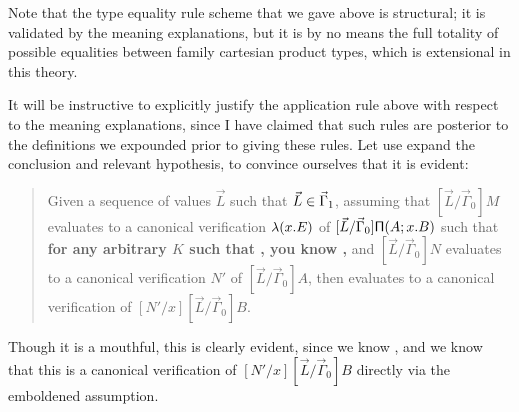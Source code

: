 \documentclass[main.tex]{subfiles}
\begin{document}
Note that the type equality rule scheme that we gave above is structural; it is
validated by the meaning explanations, but it is by no means the full totality
of possible equalities between family cartesian product types, which is
extensional in this theory.

It will be instructive to explicitly justify the application rule above with
respect to the meaning explanations, since I have claimed that such rules are
posterior to the definitions we expounded prior to giving these rules. Let use
expand the conclusion and relevant hypothesis, to convince ourselves that it is
evident:

\begin{quote}

  Given a sequence of values $\vec{L}$ such that $\vec{L}\in\vec\Gamma_1$,
  assuming that $[\vec{L}/\vec\Gamma_0]M$ evaluates to a canonical verification
  $\mathsf{\lambda}(x.E)$ of $[\vec{L}/\vec\Gamma_0]\mathsf{\Pi}(A;x.B)$ such that
  \textbf{for any arbitrary $K$ such that
  , you know
  ,} and $[\vec{L}/\vec\Gamma_0]N$
  evaluates to a canonical verification $N'$ of $[\vec{L}/\vec\Gamma_0]A$, then
   evaluates to a canonical verification of
  $[N'/x][\vec{L}/\vec\Gamma_0]B$.

\end{quote}

Though it is a mouthful, this is clearly evident, since we know
, and we know that this is a canonical
verification of $[N'/x][\vec{L}/\vec\Gamma_0]B$ directly via the emboldened
assumption.
\end{document}
